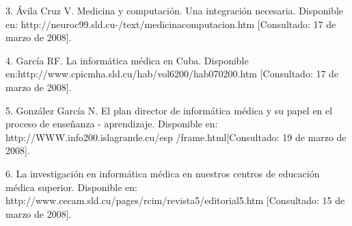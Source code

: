 \documentclass[a4paper,10pt]{article}
\begin{document}
3. Ávila Cruz V. Medicina y computación. Una integración necesaria. Disponible en: http://neuroc99.sld.cu-/text/medicinacomputacion.htm [Consultado: 17 de marzo de 2008].

4. García RF. La informática médica en Cuba. Disponible en:http://www.cpicmha.sld.cu/hab/vol6200/hab070200.htm [Consultado: 17 de marzo de 2008].

5. González García N. El plan director de informática médica y su papel en el proceso de enseñanza - aprendizaje. Disponible en: http://WWW.info200.islagrande.cu/esp /frame.html[Consultado: 19 de marzo de 2008]. 

6. La investigación en informática médica en nuestros centros de educación médica superior. Disponible en: http://www.cecam.sld.cu/pages/rcim/revista5/editorial5.htm [Consultado: 15 de marzo de 2008].
\end{document}
